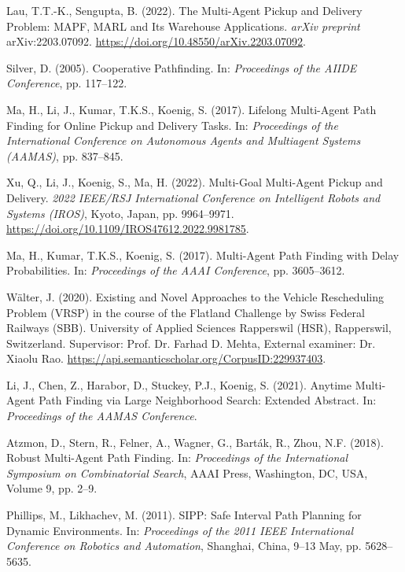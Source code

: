 \begin{thebibliography}{1}
	Lau, T.T.-K., Sengupta, B. (2022). The Multi-Agent Pickup and Delivery Problem: MAPF, MARL and Its Warehouse Applications. \textit{arXiv preprint} arXiv:2203.07092. \url{https://doi.org/10.48550/arXiv.2203.07092}.
	
	Silver, D. (2005). Cooperative Pathfinding. In: \textit{Proceedings of the AIIDE Conference}, pp. 117–122.
	
	Ma, H., Li, J., Kumar, T.K.S., Koenig, S. (2017). Lifelong Multi-Agent Path Finding for Online Pickup and Delivery Tasks. In: \textit{Proceedings of the International Conference on Autonomous Agents and Multiagent Systems (AAMAS)}, pp. 837–845.
	
	Xu, Q., Li, J., Koenig, S., Ma, H. (2022). Multi-Goal Multi-Agent Pickup and Delivery. \textit{2022 IEEE/RSJ International Conference on Intelligent Robots and Systems (IROS)}, Kyoto, Japan, pp. 9964–9971. \url{https://doi.org/10.1109/IROS47612.2022.9981785}.
	
	
	Ma, H., Kumar, T.K.S., Koenig, S. (2017). Multi-Agent Path Finding with Delay Probabilities. In: \textit{Proceedings of the AAAI Conference}, pp. 3605–3612.
	
	Wälter, J. (2020). Existing and Novel Approaches to the Vehicle Rescheduling Problem (VRSP) in the course of the Flatland Challenge by Swiss Federal Railways (SBB). University of Applied Sciences Rapperswil (HSR), Rapperswil, Switzerland. Supervisor: Prof. Dr. Farhad D. Mehta, External examiner: Dr. Xiaolu Rao. \url{https://api.semanticscholar.org/CorpusID:229937403}.
	
	
	Li, J., Chen, Z., Harabor, D., Stuckey, P.J., Koenig, S. (2021). Anytime Multi-Agent Path Finding via Large Neighborhood Search: Extended Abstract. In: \textit{Proceedings of the AAMAS Conference}.
	
	Atzmon, D., Stern, R., Felner, A., Wagner, G., Barták, R., Zhou, N.F. (2018). Robust Multi-Agent Path Finding. In: \textit{Proceedings of the International Symposium on Combinatorial Search}, AAAI Press, Washington, DC, USA, Volume 9, pp. 2–9.
	
	
	Phillips, M., Likhachev, M. (2011). SIPP: Safe Interval Path Planning for Dynamic Environments. In: \textit{Proceedings of the 2011 IEEE International Conference on Robotics and Automation}, Shanghai, China, 9–13 May, pp. 5628–5635.
	

\end{thebibliography}
